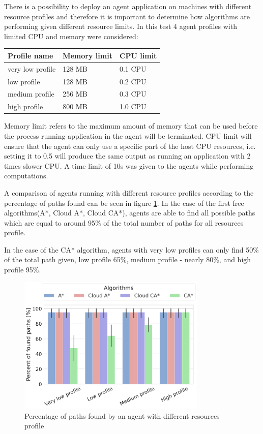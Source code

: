There is a possibility to deploy an agent application on machines with different resource profiles and therefore it is important to determine how algorithms are performing given different resource limits.
In this test 4 agent profiles with limited CPU and memory were considered:
\begin{table}[H]
\centering
\begin{tabular}{@{}lll@{}}
\toprule
Profile name     & Memory limit & CPU limit \\ \midrule
very low profile & 128 MB        & 0.1 CPU   \\
low profile      & 128 MB        & 0.2 CPU   \\
medium profile   & 256 MB        & 0.3 CPU   \\
high profile     & 800 MB        & 1.0 CPU     \\ \bottomrule
\end{tabular}%
\end{table}

Memory limit refers to the maximum amount of memory that can be used before the process running application in the agent will be terminated. CPU limit will ensure that the agent can only use a specific part of the host CPU resources, i.e. setting it to 0.5 will produce the same output as running an application with 2 times slower CPU\cite{docker_container_limits}. A time limit of 10s was given to the agents while performing computations.

A comparison of agents running with different resource profiles according to the percentage of paths found can be seen in figure \ref{fig:compare_profiles_paths}. In the case of the first free algorithms(A*, Cloud A*, Cloud CA*), agents are able to find all possible paths which are equal to around 95\% of the total number of paths for all resources profile. 

In the case of the CA* algorithm, agents with very low profiles can only find 50\% of the total path given, low profile 65\%, medium profile - nearly 80\%, and high profile 95\%. 
\begin{figure}[H]
    \centering
    \includegraphics[width=0.8\textwidth]{pictures/compare_profiles_paths.png}
    \caption{Percentage of paths found by an agent with different resources profile
    }
    \label{fig:compare_profiles_paths}
\end{figure}

